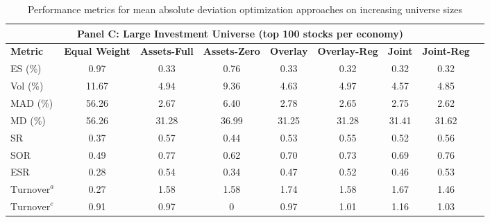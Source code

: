 \begin{table}[htbp]
{\begin{tabular}{lcccccccc}
    \midrule
    \multicolumn{8}{c}{\textbf{Panel C: Large Investment Universe (top 100 stocks per economy)}} \\
    \midrule
    \textbf{Metric} & \textbf{Equal Weight} & \textbf{Assets-Full} & \textbf{Assets-Zero} & \textbf{Overlay} & \textbf{Overlay-Reg} & \textbf{Joint} & \textbf{Joint-Reg}\\
    \midrule
    ES (\%)                     & 0.97                      & 0.33                & 0.76                & 0.33              & 0.32              & 0.32             & 0.32 \\
    Vol (\%)                    & 11.67                     & 4.94                & 9.36                & 4.63              & 4.97              & 4.57             & 4.85 \\
    MAD (\%)                    & 56.26                     & 2.67                & 6.40                & 2.78              & 2.65              & 2.75             & 2.62\\
    MD (\%)                     & 56.26                     & 31.28               & 36.99               & 31.25             & 31.28             & 31.41            & 31.62\\
    SR                          & 0.37                      & 0.57                & 0.44                & 0.53              & 0.55              & 0.52             & 0.56\\
    SOR                         & 0.49                      & 0.77                & 0.62                & 0.70              & 0.73              & 0.69             & 0.76\\
    ESR                         & 0.28                      & 0.54                & 0.34                & 0.47              & 0.52              & 0.46             & 0.53\\
    $\text{Turnover}^a$         & 0.27                      & 1.58                & 1.58                & 1.74              & 1.58              & 1.67             & 1.46\\
    $\text{Turnover}^c$         & 0.91                      & 0.97                & 0                   & 0.97              & 1.01              & 1.16             & 1.03\\ 
    \bottomrule
  \end{tabular}%
}
  \caption{Performance metrics for mean absolute deviation optimization approaches on increasing universe sizes}
  \label{tab:mad-universe-sizes}
   \vspace{0.5em}
  \begin{minipage}{\textwidth}

\end{minipage}
\end{table}
